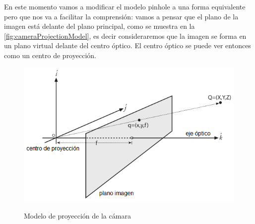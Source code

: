 En este momento vamos a modificar el modelo pinhole a una forma equivalente pero que nos va a facilitar la comprensión: vamos a pensar que el plano de la imagen está delante del plano principal, como se muestra en la \autoref{fig:cameraProjectionModel}, es decir consideraremos que la imagen se forma en un plano virtual delante del centro óptico. El centro óptico se puede ver entonces como un centro de proyección.
\begin{figure}[bth]
    \myfloatalign
        {\includegraphics[width=1.0\linewidth]{images/cameraProjectionModel}}
        \caption{Modelo de proyección de la cámara}
        \label{fig:cameraProjectionModel}
\end{figure}

